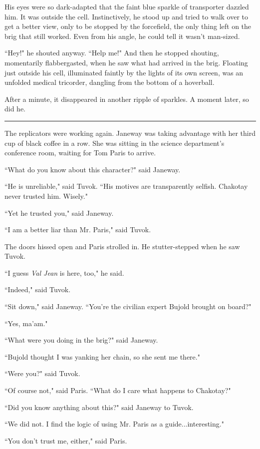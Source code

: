 \documentclass[twoside,letterpaper,12pt]{memoir}
\begin{document}
His eyes were so dark-adapted that the faint blue sparkle of transporter dazzled him. It was outside the cell. Instinctively, he stood up and tried to walk over to get a better view, only to be stopped by the forcefield, the only thing left on the brig that still worked. Even from his angle, he could tell it wasn't man-sized.

``Hey!" he shouted anyway. ``Help me!" And then he stopped shouting, momentarily flabbergasted, when he saw what had arrived in the brig. Floating just outside his cell, illuminated faintly by the lights of its own screen, was an unfolded medical tricorder, dangling from the bottom of a hoverball.

After a minute, it disappeared in another ripple of sparkles. A moment later, so did he.

\fancybreak{\rule{3cm}{0.4 pt}}
The replicators were working again. Janeway was taking advantage with her third cup of black coffee in a row. She was sitting in the science department's conference room, waiting for Tom Paris to arrive.

``What do you know about this character?" said Janeway.

``He is unreliable," said Tuvok. ``His motives are transparently selfish. Chakotay never trusted him. Wisely."

``Yet he trusted you," said Janeway.

``I am a better liar than Mr. Paris," said Tuvok.

The doors hissed open and Paris strolled in. He stutter-stepped when he saw Tuvok.

``I guess \textit{Val Jean} is here, too," he said.

``Indeed," said Tuvok.

``Sit down," said Janeway. ``You're the civilian expert Bujold brought on board?"

``Yes, ma'am."

``What were you doing in the brig?" said Janeway.

``Bujold thought I was yanking her chain, so she sent me there."

``Were you?" said Tuvok.

``Of course not," said Paris. ``What do I care what happens to Chakotay?"

``Did you know anything about this?" said Janeway to Tuvok.

``We did not. I find the logic of using Mr. Paris as a guide...interesting."

``You don't trust me, either," said Paris.
\end{document}
